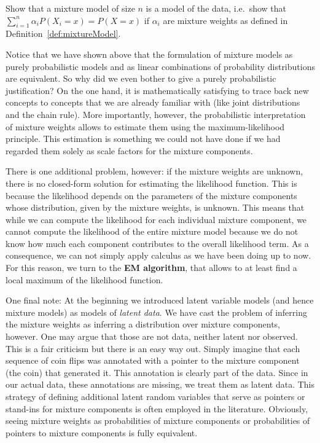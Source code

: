 \begin{Exercise}
Show that a mixture model of size $ n $ is a model of the data, i.e.\ show that $  \sum_{i=1}^n \alpha_{i}P(X_i=x) = P(X=x) $ if $ \alpha_{i} $ are mixture weights as 
defined in Definition~\ref{def:mixtureModel}.
\end{Exercise}

Notice that we have shown above that the formulation of mixture models as purely probabilistic models and as linear combinations of probability distributions are
equivalent. So why did we even bother to give a purely probabilistic justification? On the one hand, it is mathematically satisfying to trace back new concepts
to concepts that we are already familiar with (like joint distributions and the chain rule). More importantly, however, the probabilistic interpretation of mixture
weights allows to estimate them using the maximum-likelihood principle. This estimation is something we could not have done if we had regarded them solely as scale factors
for the mixture components. 

There is one additional problem, however: if the mixture weights are unknown, there is no closed-form solution for estimating the likelihood function. This is because
the likelihood depends on the parameters of the mixture components whose distribution, given
by the mixture weights, is unknown. This means that while we can compute the likelihood for each
individual mixture component, we cannot compute the likelihood of the entire mixture model because we
do not know how much each component contributes to the overall likelihood term. As a consequence, we can not 
simply apply calculus as we have been doing up to now. For this reason, we turn to the \textbf{EM algorithm}, 
that allows to at least find a local maximum of the likelihood function.

One final note: At the beginning we introduced latent variable models (and hence mixture models) as models
of \textit{latent data}. We have cast the problem of inferring the mixture weights as inferring a 
distribution over mixture components, however. One may argue that those are not data, neither latent nor 
observed. This is a fair criticism but there is an easy way out. Simply imagine that each sequence of coin
flips was annotated with a pointer to the mixture component (the coin) that generated it. This annotation
is clearly part of the data. Since in our actual data, these annotations are missing, we treat them as 
latent data. This strategy of defining additional latent random variables that serve as pointers or
stand-ins for mixture components is often employed in the literature. Obviously, seeing mixture weights
as probabilities of mixture components or probabilities of pointers to mixture components is fully 
equivalent.

